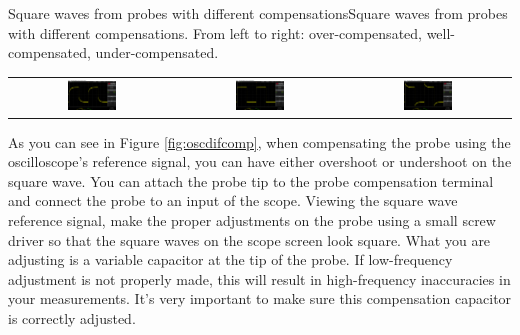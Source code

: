 \documentclass[12pt]{../manual}
\begin{document}
\begin{myfigure}[label=fig:oscdifcomp, oversize]{Square waves from probes with different compensations}{Square waves from probes with different compensations. From left to right: over-compensated, well-compensated, under-compensated.}
\begin{tabular}{ccc}
\includegraphics[width=0.31\textwidth]{figures/overcomp} & \includegraphics[width=0.31\textwidth]{figures/wellcomp} & 
\includegraphics[width=0.31\textwidth]{figures/undercomp}
\end{tabular}
\end{myfigure}


As you can see in Figure \ref{fig:oscdifcomp}, when compensating the probe using the oscilloscope's reference signal, you can have either overshoot or undershoot on the square wave. You can attach the probe tip to the probe compensation terminal and connect the probe to an input of the scope. Viewing the square wave reference signal, make the proper adjustments on the probe using a small screw driver so that the square waves on the scope screen look square. What you are adjusting is a variable capacitor at the tip of the probe. If low-frequency adjustment is not properly made, this will result in high-frequency inaccuracies in your measurements.  It's very important to make sure this compensation capacitor is correctly adjusted.

\newpage
\end{document}
